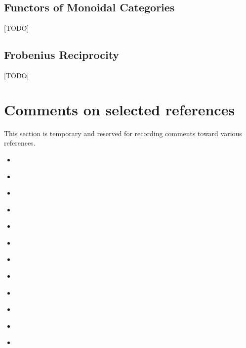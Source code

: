 \documentclass[10pt]{article}
\theoremstyle{definition}
\theoremstyle{remark}
\begin{document}
\subsection{Functors of Monoidal Categories}

\textcolor{red!50!black}{[TODO]}

\subsection{Frobenius Reciprocity}

\textcolor{red!50!black}{[TODO]}

\section*{Comments on selected references}
This section is temporary and reserved for recording comments toward various references.
\begin{itemize}
    \item \citeauthor{vistoli2004notes}~\cite{vistoli2004notes}
    \item \citeauthor{street1974fibrations}~\cite{street1974fibrations}
    \item \citeauthor{koudenburg2018categorical}~\cite{koudenburg2018categorical}
    \item \citeauthor{brown2009algebraic}~\cite{brown2009algebraic}
    \item \citeauthor{lurie2009higher}~\cite{lurie2009higher}
    \item \citeauthor{shulman2008framed}~\cite{shulman2008framed}
    \item \citeauthor{boyd2004convex}~\cite{boyd2004convex}
    \item \citeauthor{bogart2013hom}~\cite{bogart2013hom}
    \item \citeauthor{gubeladze2016affine}~\cite{gubeladze2016affine}
    \item \citeauthor{fausk2003isomorphisms}~\cite{fausk2003isomorphisms}
    \item \citeauthor{hofstra2011dialectica}~\cite{hofstra2011dialectica}
    \item \citeauthor{ponto2012duality}~\cite{ponto2012duality}
\end{itemize}

\printbibliography
\end{document}
